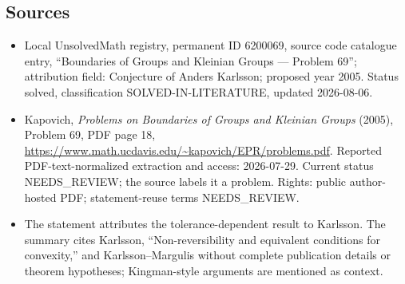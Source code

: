 \documentclass[11pt]{article}
\begin{document}
\subsection{Sources}
\begin{itemize}
\item Local UnsolvedMath registry, permanent ID 6200069, source code catalogue entry, ``Boundaries of Groups and Kleinian Groups --- Problem 69''; attribution field: Conjecture of Anders Karlsson; proposed year 2005. Status solved, classification SOLVED-IN-LITERATURE, updated 2026-08-06.
\item Kapovich, \emph{Problems on Boundaries of Groups and Kleinian Groups} (2005), Problem 69, PDF page 18, \url{https://www.math.ucdavis.edu/~kapovich/EPR/problems.pdf}. Reported PDF-text-normalized extraction and access: 2026-07-29. Current status NEEDS\_REVIEW; the source labels it a problem. Rights: public author-hosted PDF; statement-reuse terms NEEDS\_REVIEW.
\item The statement attributes the tolerance-dependent result to Karlsson. The summary cites Karlsson, ``Non-reversibility and equivalent conditions for convexity,'' and Karlsson--Margulis without complete publication details or theorem hypotheses; Kingman-style arguments are mentioned as context.
\end{itemize}
\end{document}
